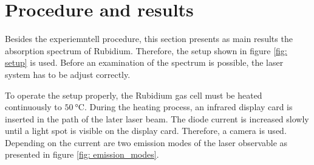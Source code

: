 \section{Procedure and results}
Besides the experiemntell procedure, this section presents as main results the
absorption spectrum of Rubidium. Therefore, the setup shown in figure \ref{fig: setup}
is used. Before an examination of the spectrum is possible, the laser system has to be
adjust correctly.

To operate the setup properly, the Rubidium gas cell must be heated
continuously to $\SI{50}{\degreeCelsius}$. During the heating process, an infrared display
card is inserted in the path of the later laser beam. The diode current is increased slowly until a
light spot is visible on the display card. Therefore, a camera is used.
Depending on the current are
two emission modes of the laser observable as presented in figure \ref{fig: emission_modes}.
